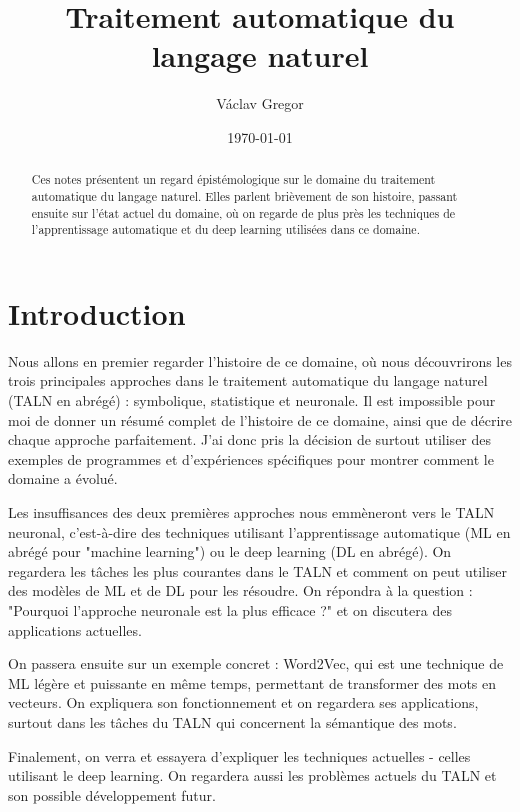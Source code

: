 \documentclass[11pt, a4paper]{report}
\title{Traitement automatique du langage naturel}
\author{Václav Gregor}
\date{\today}
\begin{document}
\maketitle
\tableofcontents


\begin{abstract}
  Ces notes présentent un regard épistémologique sur le domaine du traitement automatique du langage naturel. 
  Elles parlent brièvement de son histoire, passant ensuite sur l'état actuel du domaine, où on regarde de plus près 
  les techniques de l'apprentissage automatique et du deep learning utilisées dans ce domaine.
\end{abstract}


\chapter{Introduction}
  Nous allons en premier regarder l'histoire de ce domaine, où nous découvrirons
  les trois principales approches dans le traitement automatique du langage 
  naturel (TALN en abrégé) : symbolique, statistique et neuronale. 
  Il est impossible pour moi de donner un résumé complet de l'histoire de ce domaine, 
  ainsi que de décrire chaque approche parfaitement. J'ai donc pris la décision de surtout 
  utiliser des exemples de programmes et d'expériences spécifiques pour montrer 
  comment le domaine a évolué. 

  Les insuffisances des deux premières approches nous emmèneront vers le TALN neuronal, 
  c'est-à-dire des techniques utilisant l'apprentissage automatique (ML en abrégé pour "machine learning") ou 
  le deep learning (DL en abrégé). On regardera les tâches les plus courantes dans le TALN et comment 
  on peut utiliser des modèles de ML et de DL pour les résoudre. 
  On répondra à la question : "Pourquoi l'approche neuronale est la plus efficace ?" 
  et on discutera des applications actuelles. 
  
  On passera ensuite sur un exemple concret : Word2Vec, qui est une technique de ML légère et 
  puissante en même temps, permettant de transformer des mots en vecteurs. 
  On expliquera son fonctionnement et on regardera ses applications, surtout dans les tâches 
  du TALN qui concernent la sémantique des mots.

  Finalement, on verra et essayera d'expliquer les techniques actuelles - celles utilisant le deep learning.  
  On regardera aussi les problèmes actuels du TALN et son possible développement futur.  
  \cite{A-Brief-History-of-NLP}
  \cite{MUNI-NLP}
  \cite{NLP-Stanford-website}
  \cite{NLP-Wikipedia}
  \cite{QM-chatbots-and-no}
  \cite{QM-NN-learn-like-humans}
  \cite{QM-tiny-language-models}
\end{document}
